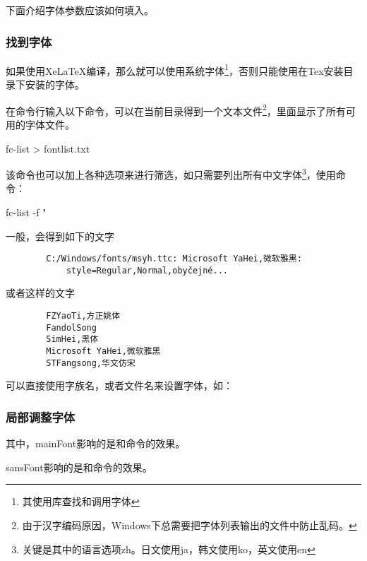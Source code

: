     下面介绍字体参数应该如何填入。
    \subsubsection{找到字体}
    如果使用XeLaTeX编译，那么就可以使用系统字体\footnote{其使用库查找和调用字体}，否则只能使用在Tex安装目录下安装的字体。

    在命令行输入以下命令，可以在当前目录得到一个文本文件\footnote{由于汉字编码原因，Windows下总需要把字体列表输出的文件中防止乱码。}，里面显示了所有可用的字体文件。
    \begin{languagebox}[bash]
        fc-list > fontlist.txt
    \end{languagebox}

    该命令也可以加上各种选项来进行筛选，如只需要列出所有中文字体\footnote{关键是其中的语言选项zh。日文使用ja，韩文使用ko，英文使用en}，使用命令：
    \begin{languagebox}[bash]
        fc-list -f "%
    \end{languagebox}

    一般，会得到如下的文字
    \begin{verbatim}
        C:/Windows/fonts/msyh.ttc: Microsoft YaHei,微软雅黑:
            style=Regular,Normal,obyčejné...
    \end{verbatim}

    或者这样的文字
    \begin{verbatim}
        FZYaoTi,方正姚体
        FandolSong
        SimHei,黑体
        Microsoft YaHei,微软雅黑
        STFangsong,华文仿宋
    \end{verbatim}
    可以直接使用字族名，或者文件名来设置字体，如：
    \begin{texcode}
        \setmainfont{Microsoft YaHei}
        \setmainfont[
            ItalicFont=STFangsong,
        ]{msyh.ttc}
    \end{texcode}

    
    \subsubsection{局部调整字体}
    其中，mainFont影响的是和命令的效果。

    

    sansFont影响的是和命令的效果。

